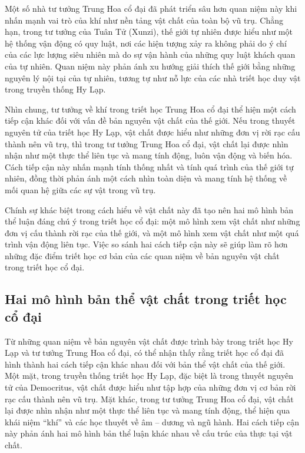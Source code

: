 \documentclass[14pt,a4paper]{extarticle}
\begin{document}
Một số nhà tư tưởng Trung Hoa cổ đại đã phát triển sâu hơn quan niệm này khi nhấn mạnh vai trò của khí như nền tảng vật chất của toàn bộ vũ trụ. Chẳng hạn, trong tư tưởng của Tuân Tử (Xunzi), thế giới tự nhiên được hiểu như một hệ thống vận động có quy luật, nơi các hiện tượng xảy ra không phải do ý chí của các lực lượng siêu nhiên mà do sự vận hành của những quy luật khách quan của tự nhiên. Quan niệm này phản ánh xu hướng giải thích thế giới bằng những nguyên lý nội tại của tự nhiên, tương tự như nỗ lực của các nhà triết học duy vật trong truyền thống Hy Lạp.

Nhìn chung, tư tưởng về khí trong triết học Trung Hoa cổ đại thể hiện một cách tiếp cận khác đối với vấn đề bản nguyên vật chất của thế giới. Nếu trong thuyết nguyên tử của triết học Hy Lạp, vật chất được hiểu như những đơn vị rời rạc cấu thành nên vũ trụ, thì trong tư tưởng Trung Hoa cổ đại, vật chất lại được nhìn nhận như một thực thể liên tục và mang tính động, luôn vận động và biến hóa. Cách tiếp cận này nhấn mạnh tính thống nhất và tính quá trình của thế giới tự nhiên, đồng thời phản ánh một cách nhìn toàn diện và mang tính hệ thống về mối quan hệ giữa các sự vật trong vũ trụ.

Chính sự khác biệt trong cách hiểu về vật chất này đã tạo nên hai mô hình bản thể luận đáng chú ý trong triết học cổ đại: một mô hình xem vật chất như những đơn vị cấu thành rời rạc của thế giới, và một mô hình xem vật chất như một quá trình vận động liên tục. Việc so sánh hai cách tiếp cận này sẽ giúp làm rõ hơn những đặc điểm triết học cơ bản của các quan niệm về bản nguyên vật chất trong triết học cổ đại.

\subsection{Hai mô hình bản thể vật chất trong triết học cổ đại}

Từ những quan niệm về bản nguyên vật chất được trình bày trong triết học Hy Lạp và tư tưởng Trung Hoa cổ đại, có thể nhận thấy rằng triết học cổ đại đã hình thành hai cách tiếp cận khác nhau đối với bản thể vật chất của thế giới. Một mặt, trong truyền thống triết học Hy Lạp, đặc biệt là trong thuyết nguyên tử của Democritus, vật chất được hiểu như tập hợp của những đơn vị cơ bản rời rạc cấu thành nên vũ trụ. Mặt khác, trong tư tưởng Trung Hoa cổ đại, vật chất lại được nhìn nhận như một thực thể liên tục và mang tính động, thể hiện qua khái niệm ``khí'' và các học thuyết về âm -- dương và ngũ hành. Hai cách tiếp cận này phản ánh hai mô hình bản thể luận khác nhau về cấu trúc của thực tại vật chất.
\end{document}
